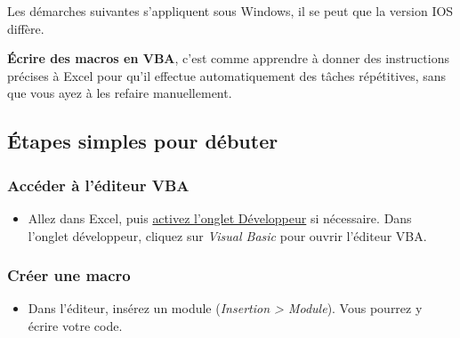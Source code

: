 \documentclass[
  letterpaper,
  DIV=11,
  numbers=noendperiod]{scrartcl}
\providecommand{\tightlist}{%
  \setlength{\itemsep}{0pt}\setlength{\parskip}{0pt}}\usepackage{longtable,booktabs,array}
\begin{document}
\begin{tcolorbox}[enhanced jigsaw, opacityback=0, colback=white, colbacktitle=quarto-callout-note-color!10!white, breakable, rightrule=.15mm, toptitle=1mm, arc=.35mm, title=\textcolor{quarto-callout-note-color}{\faInfo}\hspace{0.5em}{Note}, toprule=.15mm, bottomtitle=1mm, leftrule=.75mm, titlerule=0mm, bottomrule=.15mm, left=2mm, opacitybacktitle=0.6, coltitle=black, colframe=quarto-callout-note-color-frame]

Les démarches suivantes s'appliquent sous Windows, il se peut que la
version IOS diffère.

\end{tcolorbox}

\textbf{Écrire des macros en VBA}, c'est comme apprendre à donner des
instructions précises à Excel pour qu'il effectue automatiquement des
tâches répétitives, sans que vous ayez à les refaire manuellement.

\subsection{Étapes simples pour
débuter}\label{uxe9tapes-simples-pour-duxe9buter}

\subsubsection{Accéder à l'éditeur
VBA}\label{accuxe9der-uxe0-luxe9diteur-vba}

\begin{itemize}
\tightlist
\item
  Allez dans Excel, puis
  \href{https://support.microsoft.com/fr-fr/office/afficher-l-onglet-d\%C3\%A9veloppeur-e1192344-5e56-4d45-931b-e5fd9bea2d45}{activez
  l'onglet Développeur} si nécessaire. Dans l'onglet développeur,
  cliquez sur \emph{Visual Basic} pour ouvrir l'éditeur VBA.
\end{itemize}

\subsubsection{Créer une macro}\label{cruxe9er-une-macro}

\begin{itemize}
\tightlist
\item
  Dans l'éditeur, insérez un module (\emph{Insertion \textgreater{}
  Module}). Vous pourrez y écrire votre code.
\end{itemize}
\end{document}
